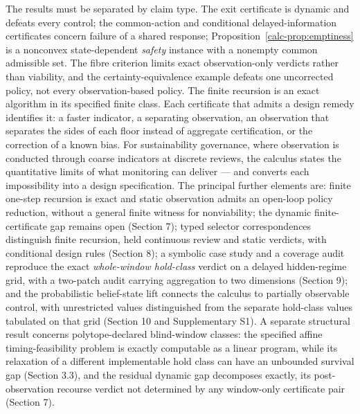 \documentclass[10pt,twocolumn]{article}
\theoremstyle{definition}
\begin{document}
The results must be separated by claim type. The exit certificate is
dynamic and defeats every control; the common-action and conditional
delayed-information certificates concern failure of a shared response;
Proposition~\ref{calc-prop:emptiness} is a nonconvex state-dependent
\emph{safety} instance with a nonempty common admissible set. The fibre
criterion limits exact observation-only verdicts rather than viability,
and the certainty-equivalence example defeats one uncorrected policy,
not every observation-based policy. The finite recursion is an exact
algorithm in its specified finite class. Each certificate that admits a design
remedy identifies it: a faster indicator, a separating observation, an
observation that separates the sides of each floor instead of aggregate
certification, or the correction of a known bias. For sustainability
governance, where observation is conducted through coarse indicators at
discrete reviews, the calculus states the quantitative limits of what
monitoring can deliver --- and converts each impossibility into a design
specification. The principal further elements are: finite one-step recursion is exact and static observation admits an open-loop policy reduction, without a general finite witness for nonviability; the dynamic finite-certificate gap remains open (Section 7); typed selector correspondences distinguish finite recursion, held continuous review and static verdicts, with conditional design rules (Section 8); a symbolic case study and a coverage audit reproduce the exact \emph{whole-window hold-class} verdict on a delayed hidden-regime grid, with a two-patch audit carrying aggregation to two dimensions (Section 9); and the probabilistic belief-state lift connects the calculus to partially observable control, with unrestricted values distinguished from the separate hold-class values tabulated on that grid (Section 10 and Supplementary S1). A separate structural result concerns polytope-declared blind-window classes: the specified affine timing-feasibility problem is exactly computable as a linear program, while its relaxation of a different implementable hold class can have an unbounded survival gap
(Section 3.3), and the residual dynamic gap decomposes exactly, its
post-observation recourse verdict not determined by any window-only certificate
pair (Section 7).
\end{document}

